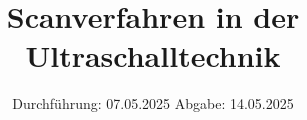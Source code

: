 

\subject{US2}
\title{Scanverfahren in der Ultraschalltechnik}
\date{%
  Durchführung: 07.05.2025
  \hspace{3em}
  Abgabe: 14.05.2025
}



\maketitle
\thispagestyle{empty}
\tableofcontents
\newpage






\printbibliography{}


